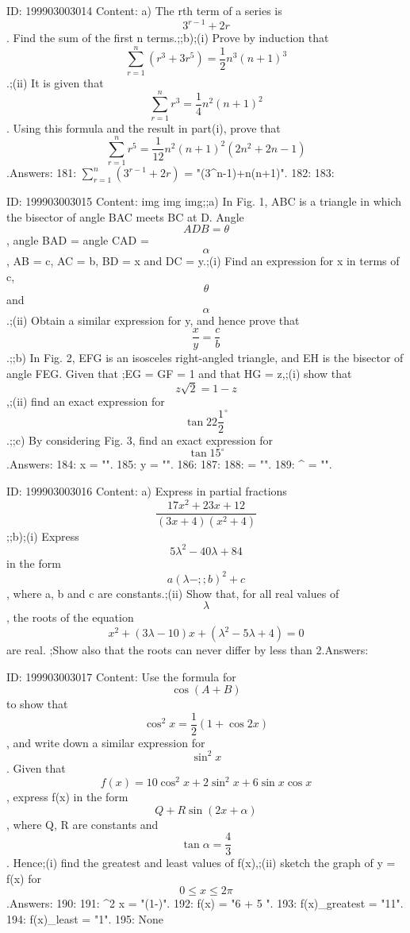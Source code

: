 \documentclass{article}
\begin{document}
ID: 199903003014
Content:
a) The rth term of a series is \[3^{r-1} + 2r\]. Find the sum of the first n terms.;;b);(i) Prove by induction that \[\sum_{r = 1}^{n} (r^3 + 3r^5) = \frac {1}{2} n^3(n + 1)^3\].;(ii) It is given that \[\sum_{r=1}^{n} r^3 = \frac {1}{4}n^2 (n+1)^2\]. Using this formula and the result in part(i), prove that \[\sum_{r=1}^{n} r^5 = \frac {1}{12}n^2 (n+1)^2 (2n^2 + 2n - 1)\].Answers:
181: $\sum\limits_{r=1}^{n}{\left({{3}^{r-1}}+2r\right)}$ = "(3^n-1)+n(n+1)".
182: 
183: 

ID: 199903003015
Content:
img img img;;a) In Fig. 1, ABC is a triangle in which the bisector of angle BAC meets BC at D. Angle \[ADB = \theta\], angle BAD = angle CAD = \[\alpha\], AB = c, AC = b, BD = x and DC = y.;(i) Find an expression for x in terms of c, \[\theta\] and \[\alpha\].;(ii) Obtain a similar expression for y, and hence prove that \[\frac {x} {y} = \frac {c} {b}\].;;b) In Fig. 2, EFG is an isosceles right-angled triangle, and EH is the bisector of angle FEG. Given that ;EG = GF = 1 and that HG = z,;(i) show that \[z\sqrt{2} = 1 - z\],;(ii) find an exact expression for \[\tan 22\frac {1}{2}^{\circ}\].;;c) By considering Fig. 3, find an exact expression for \[\tan 15^{\circ}\].Answers:
184: x = "".
185: y = "".
186: 
187: 
188:  = "".
189: ^{\circ} = "".

ID: 199903003016
Content:
a) Express in partial fractions \[\frac {17x^2 + 23x + 12}{(3x + 4)(x^2 + 4)}\];;b);(i) Express \[5\lambda^2 - 40\lambda + 84\] in the form \[a(\lambda -;;b)^2 + c\], where a, b and c are constants.;(ii) Show that, for all real values of \[\lambda\], the roots of the equation \[x^2 + (3\lambda - 10)x + (\lambda^2 - 5\lambda + 4) = 0\] are real. ;Show also that the roots can never differ by less than 2.Answers:

ID: 199903003017
Content:
Use the formula for \[\cos (A+B)\] to show that \[\cos^2 x = \frac{1}{2} (1 + \cos 2x)\], and write down a similar expression for \[\sin^2 x\]. Given that \[f(x) = 10\cos^2 x + 2\sin^2 x + 6\sin x \cos x\], express f(x) in the form \[Q + R\sin(2x + \alpha)\], where Q, R are constants and \[\tan \alpha = \frac {4}{3}\]. Hence;(i) find the greatest and least values of f(x),;(ii) sketch the graph of y = f(x) for \[0 \leq x \leq 2\pi\].Answers:
190: 
191: \sin^{2} x  = "(1-)".
192: f(x) = "6 + 5 ".
193: f(x)_{greatest} = "11".
194: f(x)_{least} = "1".
195: None
\end{document}
